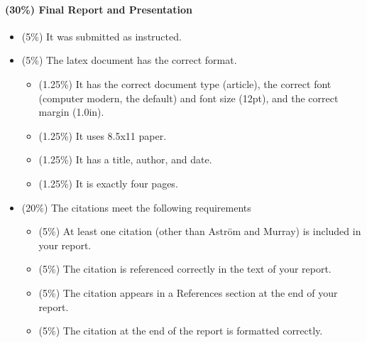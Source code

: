 \documentclass[12pt]{article}
\begin{document}
\paragraph{(30\%) Final Report and Presentation}
\begin{itemize}

\item (5\%) It was submitted as instructed.
\item (5\%) The latex document has the correct format.
\begin{itemize}
\item (1.25\%) It has the correct document type (article), the correct font (computer modern, the default) and font size (12pt), and the correct margin (1.0in).
\item (1.25\%) It uses 8.5x11 paper.
\item (1.25\%) It has a title, author, and date.
\item (1.25\%) It is exactly four pages.
\end{itemize}

\item (20\%) The citations meet the following requirements
\begin{itemize}
\item (5\%) At least one citation (other than Astr\"{o}m and Murray) is included in your report.
\item (5\%) The citation is referenced correctly in the text of your report.
\item (5\%) The citation appears in a References section at the end of your report.
\item (5\%) The citation at the end of the report is formatted correctly.
\end{itemize}

\end{itemize}

\end{document}
